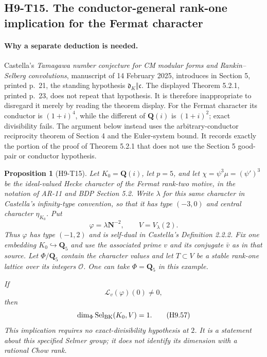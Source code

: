 \documentclass[11pt,a4paper]{article}
\newtheorem{proposition}[theorem]{Proposition}
\begin{document}
\subsection*{H9-T15. The conductor-general rank-one implication for the Fermat character}

\paragraph{Why a separate deduction is needed.}
Castella's \emph{Tamagawa number conjecture for CM modular forms and
Rankin--Selberg convolutions}, manuscript of 14 February 2025,
introduces in Section 5, printed p.~21, the standing hypothesis
$\mathfrak d_K\Vert\mathfrak c$. The displayed Theorem 5.2.1,
printed p.~23, does not repeat that hypothesis. It is therefore
inappropriate to disregard it merely by reading the theorem display.
For the Fermat character its conductor is $(1+i)^4$, while the
different of $\mathbf Q(i)$ is $(1+i)^2$; exact divisibility fails.
The argument below instead uses the arbitrary-conductor reciprocity
theorem of Section 4 and the Euler-system bound. It records exactly
the portion of the proof of Theorem 5.2.1 that does not use the
Section 5 good-pair or conductor hypothesis.

\begin{proposition}[H9-T15]
Let $K_0=\mathbf Q(i)$, let $p=5$, and let
$\chi=\psi^3\mu=(\psi')^3$ be the ideal-valued Hecke character of
the Fermat rank-two motive, in the notation of AR-11 and BDP
Section 5.2. Write $\lambda$ for this same character in Castella's
infinity-type convention, so that it has type $(-3,0)$ and central
character $\eta_{K_0}$. Put
\[
 \varphi=\lambda\mathbf N^{-2},\qquad
 V=V_\lambda(2).
\]
Thus $\varphi$ has type $(-1,2)$ and is self-dual in Castella's
Definition 2.2.2. Fix one embedding $K_0\hookrightarrow\mathbf Q_5$
and use the associated prime $v$ and its conjugate $\bar v$ as in
that source. Let $\Phi/\mathbf Q_5$ contain the character values
and let $T\subset V$ be a stable rank-one lattice over its integers
$\mathcal O$. One can take $\Phi=\mathbf Q_5$ in this example.

If
\[
                  \mathcal L_v(\varphi)(0)\ne0,              \tag{H9.56}
\]
then
\[
 \dim_\Phi\operatorname{Sel}_{\rm BK}(K_0,V)=1.             \tag{H9.57}
\]
This implication requires no exact-divisibility hypothesis at $2$.
It is a statement about this specified Selmer group; it does not
identify its dimension with a rational Chow rank.
\end{proposition}
\end{document}
